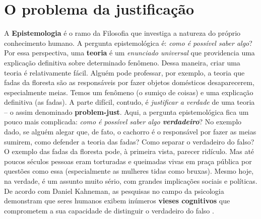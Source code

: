 \documentclass[./main.tex]{subfiles}
\begin{document}
\section{O problema da justificação} \label{sec:epis:justific}

\par A \textbf{Epistemologia} é o ramo da Filosofia que investiga a natureza do próprio conhecimento humano. A pergunta epistemológica é: \textit{como é possível saber algo}? Por essa perspectiva, uma \textbf{\gls{teoria}} é um \textit{enunciado universal} que providencia uma explicação definitiva sobre determinado fenômeno. Dessa maneira, criar uma \gls{teoria} é relativamente fácil. Alguém pode professar, por exemplo, a \gls{teoria} que fadas da floresta são as responsáveis por fazer objetos domésticos desaparecerem, especialmente meias. Temos um fenômeno (o sumiço de coisas) e uma explicação definitiva (as fadas). A parte difícil, contudo, é \textit{justificar a verdade} de uma \gls{teoria} -- o assim denominado \textbf{\gls{problem-just}}. Aqui, a pergunta epistemológica fica um pouco mais complicada: \textit{como é possível saber algo \textbf{verdadeiro}}? No exemplo dado, se alguém alegar que, de fato, o cachorro é o responsável por fazer as meias sumirem, como defender a \gls{teoria} das fadas? Como separar o verdadeiro do falso? O exemplo das fadas da floresta pode, à primeira vista, parecer ridículo. Mas até poucos séculos pessoas eram torturadas e queimadas vivas em praça pública por questões como essa (especialmente as mulheres tidas como bruxas). Mesmo hoje, na verdade, é um assunto muito sério, com grandes implicações sociais e políticas. De acordo com Daniel Kahneman, as pesquisas no campo da psicologia demonstram que seres humanos exibem inúmeros \textbf{vieses cognitivos} que comprometem a sua capacidade de distinguir o verdadeiro do falso \cite{kahneman2011}.  
\end{document}
